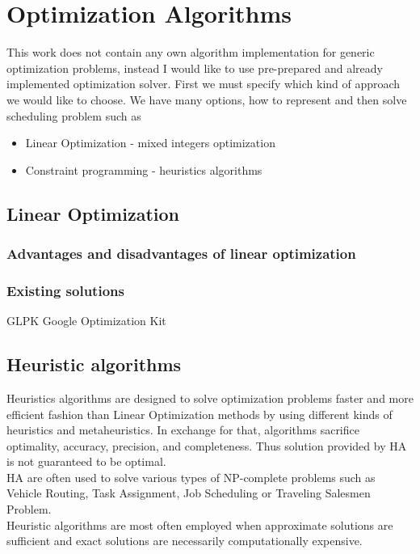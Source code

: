 
\section{Optimization Algorithms}\label{sec:optimization-algorithms}

This work does not contain any own algorithm implementation for generic optimization problems,
instead I would like to use pre-prepared and already implemented optimization solver.
First we must specify which kind of approach we would like to choose.
We have many options, how to represent and then solve scheduling problem such as
\begin{itemize}
    \item Linear Optimization - mixed integers optimization
    \item Constraint programming - heuristics algorithms
\end{itemize}

\subsection{Linear Optimization}\label{subsec:linear-optimization}


\subsubsection{Advantages and disadvantages of linear optimization}

\subsubsection{Existing solutions}\label{subsec:existing-solutions-lin}
GLPK
Google Optimization Kit

\subsection{Heuristic algorithms}\label{subsec:heuristic-algorithms}
Heuristics algorithms are designed to solve optimization problems faster
and more efficient fashion than Linear Optimization methods by using different kinds of heuristics and metaheuristics.
In exchange for that, algorithms sacrifice optimality, accuracy, precision, and completeness.
Thus solution provided by HA is not guaranteed to be optimal.\\
HA are often used to solve various types of NP-complete problems such as
Vehicle Routing, Task Assignment, Job Scheduling or Traveling Salesmen Problem.\\
Heuristic algorithms are most often employed when approximate solutions are sufficient
and exact solutions are necessarily computationally expensive.\cite{papanikolaou2018holistic}

